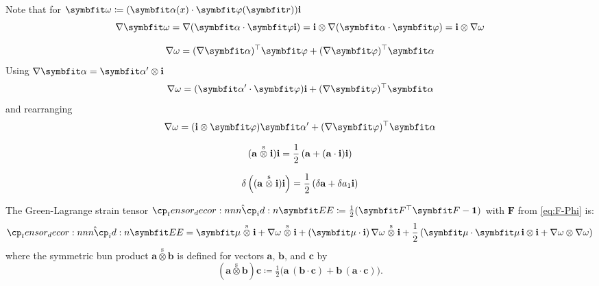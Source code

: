 %
Note that for $\bm{\AxialWarp} \coloneq (\bm{\alpha}(\reflenx)\cdot\WarpAxialShapes(\bm{r}))\FrameBasis$
$$
\nabla \bm{\AxialWarp} = \nabla (\bm{\alpha}\cdot\WarpAxialShapes\FrameBasis) = \FrameBasis\otimes\nabla(\bm{\alpha}\cdot\WarpAxialShapes) = \FrameBasis\otimes\nabla\AxialWarp
$$
\begin{Details}
$$
\nabla \AxialWarp = (\nabla\bm{\alpha})^{\top}\WarpAxialShapes  +(\nabla\WarpAxialShapes)^{\top}\bm{\alpha} 
$$
Using $\nabla \bm{\alpha} = \bm{\alpha}'\otimes\FrameBasis$
$$
\nabla \AxialWarp = (\bm{\alpha}^{\prime}\cdot\WarpAxialShapes) \FrameBasis +(\nabla\WarpAxialShapes)^{\top}\bm{\alpha}
$$
and rearranging
$$
\nabla \AxialWarp = (\FrameBasis\otimes\WarpAxialShapes) \bm{\alpha}' + (\nabla\WarpAxialShapes)^{\top}\bm{\alpha}
$$

$$
(\mathbf{a}\stackrel{\mathrm{s}}{\otimes}\mathbf{i})\mathbf{i}
=\frac{1}{2} \left(\mathbf{a} + (\mathbf{a}\cdot\mathbf{i})\mathbf{i}\right)
$$

$$
\delta \left((\mathbf{a}\stackrel{\mathrm{s}}{\otimes}\mathbf{i})\mathbf{i}\right) = \frac{1}{2}\left(\delta \mathbf{a} + \delta a_1 \mathbf{i}\right)
$$
\end{Details}
%

The Green-Lagrange strain tensor \(\hat{\StrainTensor}\coloneq\tfrac12(\bm{F}^{\top}\bm{F}-\mathbf{1})\) with \(\bm{F}\) from \eqref{eq:F-Phi} is:
\begin{equation}
\begin{aligned}
\hat{\StrainTensor} = \bm{\mu}
\stackrel{\mathrm{s}}{\otimes}
\FrameBasis 
+\nabla \AxialWarp  \stackrel{\mathrm{s}}{\otimes} \FrameBasis
+({\bm{\mu}}\cdot\FrameBasis)\,\nabla \AxialWarp  \stackrel{\mathrm{s}}{\otimes} \FrameBasis
+ \frac{1}{2}\left(
  \bm{\mu}\cdot\bm{\mu}\,\FrameBasis\otimes\FrameBasis
+ \nabla \AxialWarp \otimes\nabla \AxialWarp
\right)
\end{aligned}
\label{eq:exact-gl-strain-Phi}
\end{equation}
where the symmetric bun product \(\bm{a}\stackrel{\mathrm{s}}{\otimes}\bm{b}\) is defined for vectors \(\bm{a}\), \(\bm{b}\), and \(\bm{c}\) by
\begin{equation*}
    (\bm{a}\stackrel{\mathrm{s}}{\otimes}\bm{b} )\bm{c} \coloneq \tfrac{1}{2} \bigl(
      \bm{a}\,(\bm{b}\cdot\bm{c}) + \bm{b}\,(\bm{a}\cdot\bm{c})
    \bigr).
\end{equation*}


